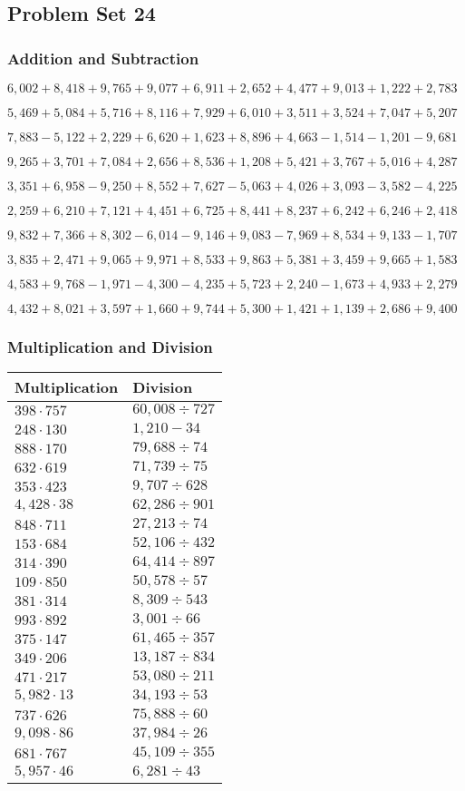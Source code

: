 \hypertarget{problem-set-24-3}{%
\subsection{Problem Set 24}\label{problem-set-24-3}}

\hypertarget{addition-and-subtraction-186}{%
\subsubsection{Addition and
Subtraction}\label{addition-and-subtraction-186}}

\(6,002+8,418+9,765+9,077+6,911+2,652+4,477+9,013+1,222+ 2,783\)

\(5,469+5,084+5,716+8,116+7,929+6,010+3,511+3,524+7,047+5,207\)

\(7,883-5,122+2,229+6,620+1,623+8,896+4,663-1,514-1,201-9,681\)

\(9,265+3,701+7,084+2,656+8,536+1,208+5,421+3,767+5,016+4,287\)

\(3,351+6,958-9,250+8,552+7,627-5,063+4,026+3,093-3,582-4,225\)

\(2,259+6,210+7,121+4,451+6,725+8,441+8,237+6,242+6,246+2,418\)

\(9,832+7,366+8,302-6,014-9,146+9,083-7,969+8,534+9,133-1,707\)

\(3,835+2,471+9,065+9,971+8,533+9,863+5,381+3,459+9,665+1,583\)

\(4,583+9,768-1,971-4,300-4,235+5,723+2,240-1,673+4,933+2,279\)

\(4,432+8,021+3,597+1,660+9,744+5,300+1,421+1,139+2,686+9,400\)

\hypertarget{multiplication-and-division-185}{%
\subsubsection{Multiplication and
Division}\label{multiplication-and-division-185}}

\begin{longtable}[]{@{}ll@{}}
\toprule
Multiplication & Division\tabularnewline
\midrule
\endhead
\(398\cdot757\) & \(60,008÷727\)\tabularnewline
\(248\cdot130\) & \(1,210-34\)\tabularnewline
\(888\cdot170\) & \(79,688÷74\)\tabularnewline
\(632\cdot619\) & \(71,739÷75\)\tabularnewline
\(353\cdot423\) & \(9,707÷628\)\tabularnewline
\(4,428\cdot38\) & \(62,286÷901\)\tabularnewline
\(848\cdot711\) & \(27,213÷74\)\tabularnewline
\(153\cdot684\) & \(52,106÷432\)\tabularnewline
\(314\cdot390\) & \(64,414÷897\)\tabularnewline
\(109\cdot850\) & \(50,578÷57\)\tabularnewline
\(381\cdot314\) & \(8,309÷543\)\tabularnewline
\(993\cdot892\) & \(3,001÷66\)\tabularnewline
\(375\cdot147\) & \(61,465÷357\)\tabularnewline
\(349\cdot206\) & \(13,187÷834\)\tabularnewline
\(471\cdot217\) & \(53,080÷211\)\tabularnewline
\(5,982\cdot13\) & \(34,193÷53\)\tabularnewline
\(737\cdot626\) & \(75,888÷60\)\tabularnewline
\(9,098\cdot86\) & \(37,984÷26\)\tabularnewline
\(681\cdot767\) & \(45,109÷355\)\tabularnewline
\(5,957\cdot46\) & \(6,281÷43\)\tabularnewline
\bottomrule
\end{longtable}

